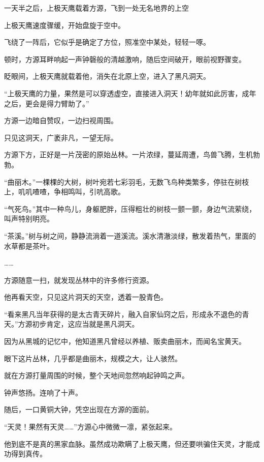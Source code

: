 
\begin{this_body}



一天半之后，上极天鹰载着方源，飞到一处无名地界的上空

上极天鹰速度骤缓，开始盘旋于空中。

飞绕了一阵后，它似乎是确定了方位，照准空中某处，轻轻一啄。

顿时，方源耳畔响起一声钟磬般的清越激响，随后空间破开，眼前视野骤变。

眨眼间，上极天鹰就载着他，消失在北原上空，进入了黑凡洞天。

“上极天鹰的力量，果然是可以穿透虚空，直接进入洞天！幼年就如此厉害，成年之后，更会是得力臂助了。”

方源一边暗自赞叹，一边扫视周围。

只见这洞天，广袤非凡，一望无际。

方源下方，正好是一片茂密的原始丛林。一片浓绿，蔓延周遭，鸟兽飞腾，生机勃勃。

“曲丽木。”一棵棵的大树，树叶宛若七彩羽毛，无数飞鸟种类繁多，停驻在树枝上，叽叽喳喳，争相鸣叫，引吭高歌。

“气死鸟。”其中一种鸟儿，身躯肥胖，压得粗壮的树枝一颤一颤，身边气流萦绕，叫声特别明亮。

“茶溪。”树与树之间，静静流淌着一道溪流。溪水清澈淡绿，散发着热气，里面的水草都是茶叶。

……

方源随意一扫，就发现丛林中的许多修行资源。

他再看天空，只见这片洞天的天空，透着一股青色。

“看来黑凡当年获得的是太古青天碎片，融入自家仙窍之后，形成永不退色的青天。”方源初步肯定，这应当就是黑凡洞天。

因为从黑城的记忆中，他知道黑凡曾经以养植、贩卖曲丽木，而闻名宝黄天。

眼下这片丛林，几乎都是曲丽木，规模之大，让人骇然。

就在方源打量周围的时候，整个天地间忽然响起钟鸣之声。

钟声悠扬。连响了十声。

随后，一口黄铜大钟，凭空出现在方源的面前。

“天灵！果然有天灵……”方源心中微微一凛，紧张起来。

他到底不是真的黑家血脉。虽然成功欺瞒了上极天鹰，但还要哄骗住天灵，才能成功得到真传。


\end{this_body}
